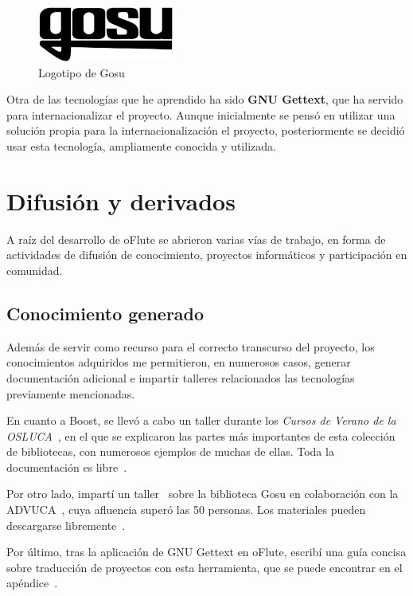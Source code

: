 \begin{figure}[htp!]
  \centering
  \includegraphics[width=0.4\textwidth]{8_conclusiones/imagen_logogosu}
  \caption{Logotipo de Gosu}
\end{figure}

Otra de las tecnologías que he aprendido ha sido \textbf{GNU Gettext}, que ha
servido para internacionalizar el proyecto. Aunque inicialmente se pensó en
utilizar una solución propia para la internacionalización el proyecto,
posteriormente se decidió usar esta tecnología, ampliamente conocida y
utilizada.

\section{Difusión y derivados}

A raíz del desarrollo de oFlute se abrieron varias vías de trabajo, en forma de
actividades de difusión de conocimiento, proyectos informáticos y participación
en comunidad.

\subsection{Conocimiento generado}

Además de servir como recurso para el correcto transcurso del proyecto, los
conocimientos adquiridos me permitieron, en numerosos casos, generar
documentación adicional e impartir talleres relacionados las tecnologías
previamente mencionadas.

En cuanto a Boost, se llevó a cabo un taller durante los \textit{Cursos de
  Verano de la OSLUCA}~\cite{cursosverano}, en el que se explicaron las partes
más importantes de esta colección de bibliotecas, con numerosos ejemplos de
muchas de ellas. Toda la documentación es libre~\cite{materialesCursoBoost}.

Por otro lado, impartí un taller~\cite{tallergosu} sobre la biblioteca Gosu en
colaboración con la ADVUCA~\cite{advuca}, cuya afluencia superó las 50
personas. Los materiales pueden descargarse
libremente~\cite{tallergosumateriales}.

Por último, tras la aplicación de GNU Gettext en oFlute, escribí una guía
concisa sobre traducción de proyectos con esta herramienta, que se puede
encontrar en el apéndice~\textit{}.


